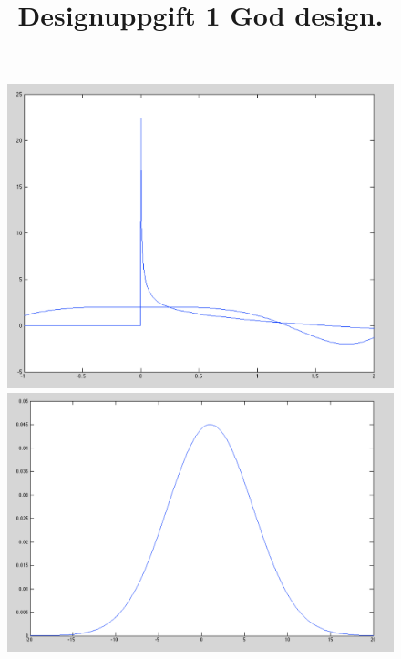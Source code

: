 \documentclass[a4paper,10pt]{article}
\begin{document}
    \title{Designuppgift 1
    God design.}

    \begin{figure}
        \includegraphics[width=\textwidth]{plot1.png}
        \includegraphics[width=\textwidth]{plot2.png}
        \caption{}
    \end{figure}
\end{document}
